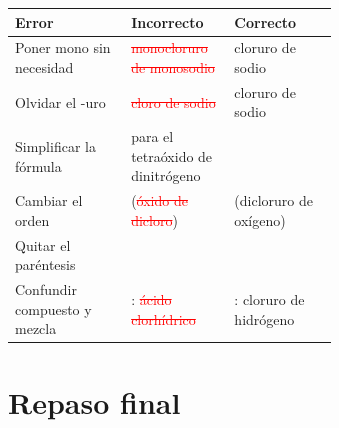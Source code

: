 \documentclass[12pt]{article}
\theoremstyle{mygreennumbox}
\newcommand{\mal}[1]{\textcolor{red}{\sout{#1}}}
\begin{document}
\begin{center}
    \begin{tabular}{@{}l L{0.32\linewidth} L{0.32\linewidth}@{}}
        \toprule
        \textbf{Error} & \textbf{Incorrecto} & \textbf{Correcto} \\
        \midrule
        Poner mono sin necesidad & \mal{monocloruro de monosodio} & cloruro de sodio \\[3pt]
        Olvidar el -uro & \mal{cloro de sodio} & cloruro de sodio \\[3pt]
        Simplificar la fórmula & \mal{} para el tetraóxido de dinitrógeno &  \\[3pt]
        Cambiar el orden & \mal{} (\mal{óxido de dicloro}) &  (dicloruro de oxígeno) \\[3pt]
        Quitar el paréntesis & \mal{} &  \\[3pt]
        Confundir compuesto y mezcla & : \mal{ácido clorhídrico} & : cloruro de hidrógeno \\
        \bottomrule
    \end{tabular}
\end{center}

\newpage
\section{Repaso final}
\end{document}
